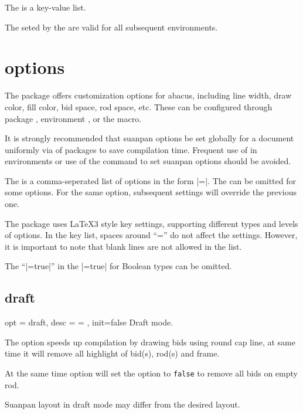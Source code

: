 \documentclass[full]{l3doc}
\begin{document}
\begin{documentation}
  The  is a key-value list.

  The  seted by the  are valid for
  all subsequent  environments.

\section{options}

The  package offers customization options for abacus,
including line width, draw color, fill color, bid space, rod space, etc.
These can be configured through package , 
environment , or the  macro.

It is strongly recommended that suanpan options be set globally
for a document uniformly via  of packages to save compilation time.
Frequent use of  in  environments or
use of the  command to set suanpan options should be avoided.

The  is a comma-seperated list of options in the form
|=|. The  can be omitted for some options.
For the same option, subsequent settings will override the previous one.

The  package uses \LaTeX3 style key settings,
supporting different types and levels of options. In the key list,
spaces around ``='' do not affect the settings.
However, it is important to note that blank lines are not allowed in the list.

The ``|=true|'' in the |=true| for Boolean types can be omitted.

\subsection{draft}

\begin{option}{ opt = draft, desc = {= }, init=false }
  Draft mode.
\end{option}

  The  option speeds up compilation by drawing
  bids using round cap line, at same time it will remove all
  highlight of bid(s), rod(s) and frame.

  At the same time  option will set the  option
  to \texttt{false} to remove all bids on empty rod.

  \begin{noteen}
    Suanpan layout in draft mode may differ from the desired layout.
  \end{noteen}


\end{documentation}
\end{document}
